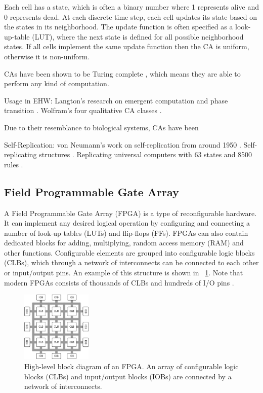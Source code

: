 Each cell has a state, which is often a binary number where 1 represents alive and 0 represents dead.
At each discrete time step, each cell updates its state based on the states in its neighborhood.
The update function is often specified as a look-up-table (LUT), where the next state is defined for all possible neighborhood states\footnotemark.
If all cells implement the same update function then the CA is uniform, otherwise it is non-uniform.

CAs have been shown to be Turing complete \cite{neumann1966selfreplication} \cite{codd1968cellular}, which means they are able to perform any kind of computation.

Usage in EHW:
Langton's research on emergent computation and phase transition \cite{langton1990edgeofchaos}.
Wolfram's four qualitative CA classes \cite{wolfram1984complexity}.

Due to their resemblance to biological systems, CAs have been 

Self-Replication:
von Neumann's work on self-replication from around 1950 \cite{neumann1966selfreplication}.
Self-replicating structures \cite{reggia1998neumann}.
Replicating universal computers with 63 states and 8500 rules \cite{perrier1996toward}.

\subsection{Field Programmable Gate Array}

A Field Programmable Gate Array (FPGA) is a type of reconfigurable hardware.
It can implement any desired logical operation by configuring and connecting a number of look-up tables (LUTs) and flip-flops (FFs).
FPGAs can also contain dedicated blocks for adding, multiplying, random access memory (RAM) and other functions.
Configurable elements are grouped into configurable logic blocks (CLBs), which through a network of interconnects can be connected to each other or input/output pins.
An example of this structure is shown in \figurename~\ref{fig:fpga}.
Note that modern FPGAs consists of thousands of CLBs and hundreds of I/O pins \cite{ds160}.

\begin{figure}[!ht]
    \centering
    \includegraphics[width=0.30\textwidth]{figures/fpga}
    \caption{High-level block diagram of an FPGA. An array of configurable logic blocks (CLBs) and input/output blocks (IOBs) are connected by a network of interconnects.}
    \label{fig:fpga}
\end{figure}

